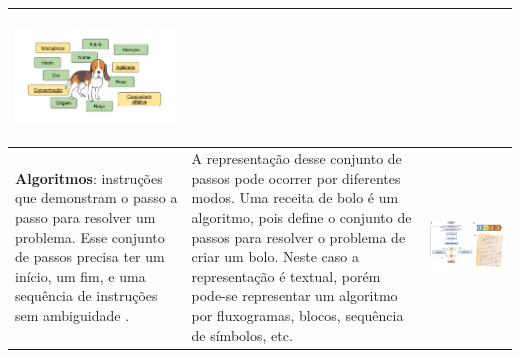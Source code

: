\begin{landscape}
\begin{quadro}[!htbp]
\begin{center}
\begin{footnotesize}
\begin{tabular}{|p{6cm}|p{9cm}|p{5cm}|}
\begin{center}
                \includegraphics[width=1\linewidth]{figs/abstraction.png}    
            \end{center}
            
            \\ \hline
            \textbf{Algoritmos}: instruções que demonstram o passo a passo para resolver um problema. Esse conjunto de passos precisa ter um início, um fim, e uma sequência de instruções sem ambiguidade \cite{bbc_learning_what_2015}.
            
            &
            A representação desse conjunto de passos pode ocorrer por diferentes modos. Uma receita de bolo é um algoritmo, pois define o conjunto de passos para resolver o problema de criar um bolo. Neste caso a representação é textual, porém pode-se representar um algoritmo por fluxogramas, blocos, sequência de símbolos, etc.
            &
            \begin{center}
                \includegraphics[width=1\linewidth]{figs/algoritmo.png}    
            \end{center}
            
            \\ \hline
            
        \end{tabular}
         
        \end{footnotesize}
    \end{center}
    \end{quadro}
\end{landscape}

